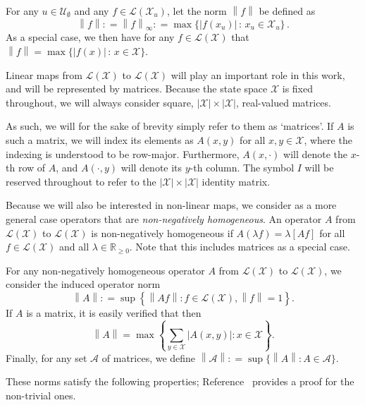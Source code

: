 \documentclass[10pt,a4paper]{paper}
\theoremstyle{definition}
\newcommand{\reals}{\mathbb{R}}
\newcommand{\realsnonneg}{\reals_{\geq 0}}
\newcommand{\states}{\mathcal{X}}
\newcommand{\gambles}{\mathcal{L}}
\newcommand{\gamblesX}{\gambles(\states)}
\newcommand{\norm}[1]{\left\lVert #1 \right\rVert}
\newcommand{\abs}[1]{\left\vert #1 \right\vert}
\newcommand{\coloneqq}{:\!=}
\begin{document}
For any $u\in\mathcal{U}_\emptyset$ and any $f\in\gambles(\states_u)$, let the norm $\norm{f}$ be defined as
\begin{equation*}\label{notation:norm}
\norm{f} \coloneqq \norm{f}_{\infty} \coloneqq \max\{\abs{f(x_u)}\,:\,x_u\in\states_u\}\,.
\end{equation*}
As a special case, we then have for any $f\in\gamblesX$ that $\norm{f}=\max\{\abs{f(x)}\,:\,x\in\states\}$.

Linear maps from $\gamblesX$ to $\gamblesX$ will play an important role in this work, and will be represented by matrices. Because the state space $\states$ is fixed throughout, we will always consider square, $\abs{\states}\times\abs{\states}$, real-valued matrices.
 
As such, we will for the sake of brevity simply refer to them as `matrices'. If $A$ is such a matrix, we will index its elements as $A(x,y)$ for all $x,y\in\states$, where the indexing is understood to be row-major. Furthermore, $A(x,\cdot)$ will denote the $x$-th row of $A$, and $A(\cdot,y)$ will denote its $y$-th column. The symbol $I$ will be reserved throughout to refer to the $\abs{\states}\times\abs{\states}$ identity matrix.

Because we will also be interested in non-linear maps, we consider as a more general case operators that are \emph{non-negatively homogeneous}. An operator $A$ from $\gamblesX$ to $\gamblesX$ is non-negatively homogeneous if $A(\lambda f)=\lambda \left[Af\right]$ for all $f\in\gamblesX$ and all $\lambda\in\realsnonneg$. Note that this includes matrices as a special case.

For any non-negatively homogeneous operator $A$ from $\gamblesX$ to $\gamblesX$, we consider the induced operator norm
\begin{equation}\label{eq:operatornorm}
\norm{A}\coloneqq\sup\left\{\norm{Af}\colon f\in\gamblesX,\norm{f}=1\right\}.
\end{equation}
If $A$ is a matrix, it is easily verified that then
\begin{equation}\label{eq:normofmatrix}
\norm{A}
=
\max\left\{\sum_{y\in\states}\abs{A(x,y)}\colon x\in\states\right\}.
\end{equation}
\noindent
Finally, for any set $\mathcal{A}$ of matrices, we define $\norm{\mathcal{A}}\coloneqq\sup\{\norm{A}\colon A\in\mathcal{A}\}$.

These norms satisfy the following properties; Reference~\cite{DeBock:2016} provides a proof for the non-trivial ones.
\end{document}
